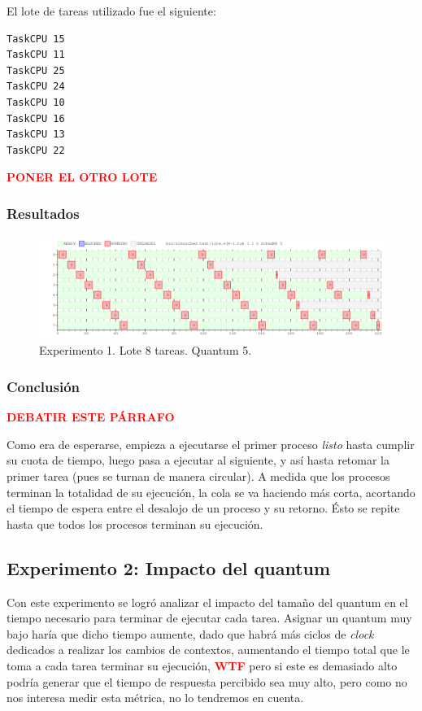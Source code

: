 \documentclass[a4paper]{article}
\begin{document}
El lote de tareas utilizado fue el siguiente:

\begin{verbatim}
TaskCPU 15
TaskCPU 11
TaskCPU 25
TaskCPU 24
TaskCPU 10
TaskCPU 16
TaskCPU 13
TaskCPU 22
\end{verbatim}

\textbf{\textcolor{red}{PONER EL OTRO LOTE}}

\subsubsection{Resultados}
\begin{figure}[htb]
\begin{center}
\includegraphics[scale=0.4]{imagenes/ej4-1.png}
\end{center}
\caption{Experimento 1. Lote 8 tareas. Quantum 5.}
\end{figure}

\subsubsection{Conclusión}

\textcolor{red}{\textbf{DEBATIR ESTE PÁRRAFO}}

Como era de esperarse, empieza a ejecutarse el primer proceso \textit{listo}
hasta cumplir su cuota de tiempo, luego pasa a ejecutar al siguiente, y así
hasta retomar la primer tarea (pues se turnan de manera circular). A medida
que los procesos terminan la totalidad de su ejecución, la cola se va
haciendo más corta, acortando el tiempo de espera entre el desalojo de un
proceso y su retorno. Ésto se repite hasta que todos los procesos terminan
su ejecución.

\subsection{Experimento 2: Impacto del quantum}
Con este experimento se logró analizar el impacto del tamaño del quantum en
el tiempo necesario para terminar de ejecutar cada tarea. Asignar un quantum
muy bajo haría que dicho tiempo aumente, dado que habrá más ciclos de
\textit{clock} dedicados a realizar los cambios de contextos, aumentando el
tiempo total que le toma a cada tarea terminar su ejecución,
\textcolor{red}{\textbf{WTF}} pero si este es demasiado alto podría generar
que el tiempo de respuesta percibido sea muy alto, pero como no nos interesa
medir esta métrica, no lo tendremos en cuenta.
\end{document}
